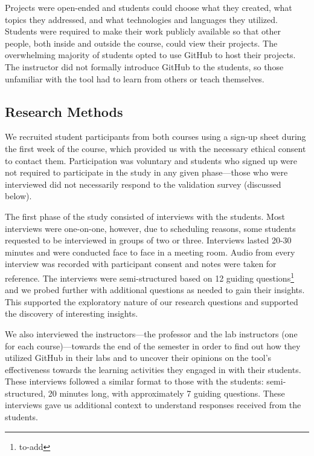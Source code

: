 Projects were open-ended and students could choose what they created, what topics they addressed, and what technologies and languages they utilized. Students were required to make their work publicly available so that other people, both inside and outside the course, could view their projects. The overwhelming majority of students opted to use GitHub to host their projects. The instructor did not formally introduce GitHub to the students, so those unfamiliar with the tool had to learn from others or teach themselves.

\subsection{Research Methods}
We recruited student participants from both courses using a sign-up sheet during the first week of the course, which provided us with the necessary ethical consent to contact them. Participation was voluntary and students who signed up were not required to participate in the study in any given phase---those who were interviewed did not necessarily respond to the validation survey (discussed below).

The first phase of the study consisted of interviews with the students. Most interviews were one-on-one, however, due to scheduling reasons, some students requested to be interviewed in groups of two or three. Interviews lasted 20-30 minutes and were conducted face to face in a meeting room. Audio from every interview was recorded with participant consent and notes were taken for reference. The interviews were semi-structured based on 12 guiding questions\footnote{to-add} and we probed further with additional questions as needed to gain their insights. This supported the exploratory nature of our research questions and supported the discovery of interesting insights.   

We also interviewed the instructors---the professor and the lab instructors (one for each course)---towards the end of the semester in order to find out how they utilized GitHub in their labs and to uncover their opinions on the tool's effectiveness towards the learning activities they engaged in with their students. These interviews followed a similar format to those with the students: semi-structured, 20 minutes long, with approximately 7 guiding questions.  These interviews gave us additional context to understand responses received from the students. 

